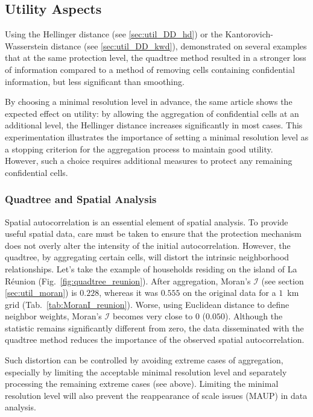 \subsection{Utility Aspects}

Using the Hellinger distance (see \ref{sec:util_DD_hd}) or the Kantorovich-Wasserstein distance (see \ref{sec:util_DD_kwd}), \cite{GussenbauerEtAl2023} demonstrated on several examples that at the same protection level, the quadtree method resulted in a stronger loss of information compared to a method of removing cells containing confidential information, but less significant than smoothing.

By choosing a minimal resolution level in advance, the same article shows the expected effect on utility: by allowing the aggregation of confidential cells at an additional level, the Hellinger distance increases significantly in most cases. This experimentation illustrates the importance of setting a minimal resolution level as a stopping criterion for the aggregation process to maintain good utility. However, such a choice requires additional measures to protect any remaining confidential cells.

\subsubsection{Quadtree and Spatial Analysis}

Spatial autocorrelation is an essential element of spatial analysis. To provide useful spatial data, care must be taken to ensure that the protection mechanism does not overly alter the intensity of the initial autocorrelation. However, the quadtree, by aggregating certain cells, will distort the intrinsic neighborhood relationships. Let's take the example of households residing on the island of La Réunion (Fig.~\ref{fig:quadtree_reunion}). After aggregation, Moran's $\mathcal{I}$ (see section \ref{sec:util_moran}) is $0.228$, whereas it was $0.555$ on the original data for a $1$~km grid (Tab.~\ref{tab:MoranI_reunion}). Worse, using Euclidean distance to define neighbor weights, Moran's $\mathcal{I}$ becomes very close to $0$ ($0.050$). Although the statistic remains significantly different from zero, the data disseminated with the quadtree method reduces the importance of the observed spatial autocorrelation.

Such distortion can be controlled by avoiding extreme cases of aggregation, especially by limiting the acceptable minimal resolution level and separately processing the remaining extreme cases (see above). Limiting the minimal resolution level will also prevent the reappearance of scale issues (MAUP) in data analysis.

